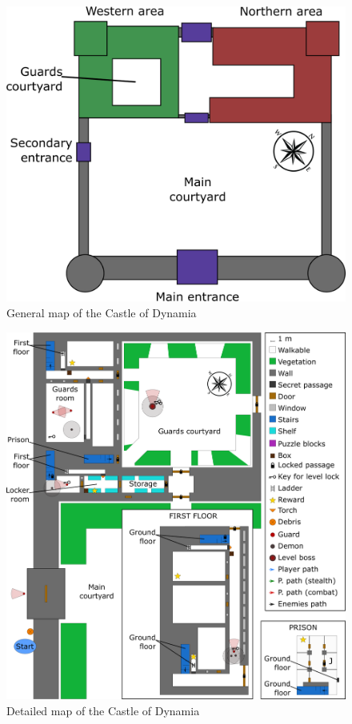 \begin{figure}[H]
  \centering
  \includegraphics[width=12cm]{Images/Maps/castleOfDynamiaFull}
  \caption{General map of the Castle of Dynamia}
\end{figure}

\begin{figure}[H]
  \centering
  \includegraphics[width=\textwidth]{Images/Maps/castleOfDynamia}
  \caption{Detailed map of the Castle of Dynamia}
\end{figure}

